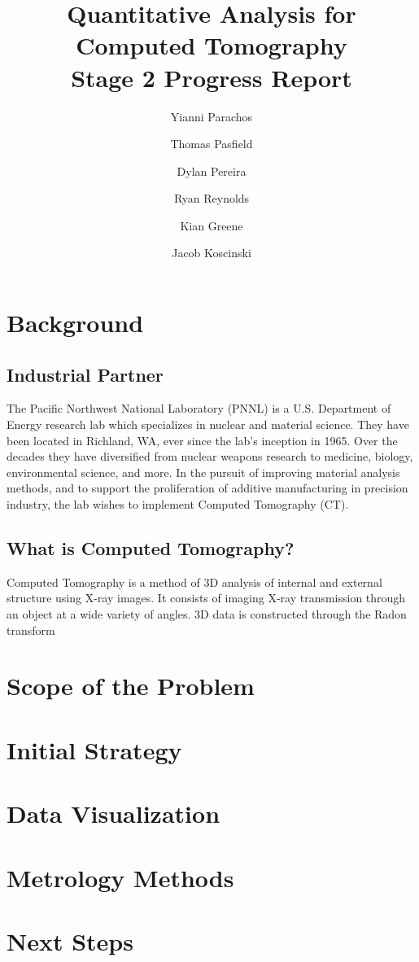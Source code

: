 \documentclass[11pt, letterpaper, notitlepage]{article}
\title{%
  Quantitative Analysis for Computed Tomography\\
  \large \vspace{1em}\textbf{Stage 2 Progress Report}
}
\author{Yianni Parachos}
\author{Thomas Pasfield}
\author{Dylan Pereira}
\author{Ryan Reynolds}
\author{Kian Greene}
\author{Jacob Koscinski}
\affil{Embry-Riddle Aeronautical University, Daytona Beach, FL}
\begin{document}
\maketitle


\begin{multicols}{2}
\section{Background}
  \subsection{Industrial Partner}
    The Pacific Northwest National Laboratory (PNNL) is a U.S. Department of Energy research lab which specializes in nuclear and material science. They have been located in Richland, WA, ever since the lab's inception in 1965. Over the decades they have diversified from nuclear weapons research to medicine, biology, environmental science, and more. In the pursuit of improving material analysis methods, and to support the proliferation of additive manufacturing in precision industry, the lab wishes to implement Computed Tomography (CT).

  \subsection{What is Computed Tomography?}
    Computed Tomography is a method of 3D analysis of internal and external structure using X-ray images. It consists of imaging X-ray transmission through an object at a wide variety of angles. 3D data is constructed through the Radon transform 

\section{Scope of the Problem}

\section{Initial Strategy}

\section{Data Visualization}

\section{Metrology Methods}

\section{Next Steps}

\end{multicols}
\end{document}
